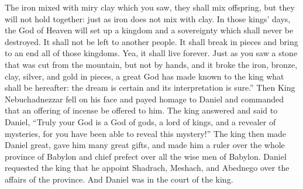 \begin{enumerate}[align=center]
     The iron mixed with miry clay which you saw, they shall mix offspring, but they will not hold together: just as iron does not mix with clay.%
     In those kings' days, the God of Heaven will set up a kingdom and a sovereignty which shall never be destroyed. It shall not be left to another people. It shall break in pieces and bring to an end all of those kingdoms. Yea, it shall live forever.%
     Just as you saw a stone that was cut from the mountain, but not by hands, and it broke the iron, bronze, clay, silver, and gold in pieces, a great God has made known to the king what shall be hereafter: the dream is certain and its interpretation is sure.''%
     Then King Nebuchadnezzar fell on his face and payed homage to Daniel and commanded that an offering of incense be offered to him.%
     The king answered and said to Daniel, ``Truly your God is a God of gods, a lord of kings, and a revealer of mysteries, for you have been able to reveal this mystery!''%
     The king then made Daniel great, gave him many great gifts, and made him a ruler over the whole province of Babylon and chief prefect over all the wise men of Babylon.%
     Daniel requested the king that he appoint Shadrach, Meshach, and Abednego over the affairs of the province. And Daniel was in the court of the king.%
\end{enumerate}
